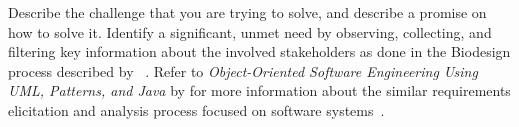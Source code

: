 \documentclass[
	pdftex,
	letterpaper,
	titlepage,
	final,
	oneside,
	11pt,
	DIV=calc,
]{scrbook}
\begin{document}
\begin{tcolorbox}[breakable]
	Describe the challenge that you are trying to solve, and describe a promise on how to solve it.
	Identify a significant, unmet need by observing, collecting, and filtering key information about the involved stakeholders as done in the Biodesign process described by \citeauthor{yock2015biodesign}~\cite{yock2015biodesign}.
	Refer to \textit{Object-Oriented Software Engineering Using UML, Patterns, and Java} by \citeauthor{bruegge2013object} for more information about the similar requirements elicitation and analysis process focused on software systems~\cite{bruegge2013object}.

\end{tcolorbox}
\end{document}
